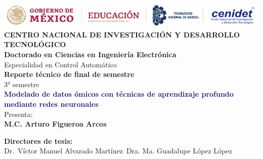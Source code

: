 \begin{titlepage}
    \begin{center}
        \noindent \includegraphics[width=\textwidth]{Imagenes/logos latex.PNG} \\[2cm] %
        \textbf{{\Huge CENTRO NACIONAL DE INVESTIGACIÓN Y DESARROLLO TECNOLÓGICO}}\\[1cm]
        
        \textbf{\Large{Doctorado en Ciencias en Ingeniería Electrónica}}\\
        {\large Especialidad en Control Automático}\\[1cm]
        
        \textbf{{\Large Reporte técnico de final de semestre}}\\
        {\large 3° semestre}\\[1cm]
              
        \textbf{\Large{\textcolor{MidnightBlue}{Modelado de datos ómicos con técnicas de aprendizaje profundo mediante redes neuronales}}}\\[1cm]
        
        {\large Presenta:}\\
        \textbf{{\Large M.C. Arturo Figueroa Arcos}}\\[1cm]
    
    \end{center}
    \begin{minipage}{0.46\textwidth}								
        \begin{flushleft}
        \begin{center}
    
            \textbf{Directores de tesis:}\\
        
            Dr.\ Víctor Manuel Alvarado Martínez\
            Dra. Ma. Guadalupe López López\\
            
    \end{center}
    \end{flushleft}
    \end{minipage}		
    \begin{minipage}{0.52\textwidth}		
    \vspace{0cm}
    \begin{flushright}															%
    \begin{center}
    

\end{center}
\end{flushright}
\end{minipage}
\end{titlepage}
